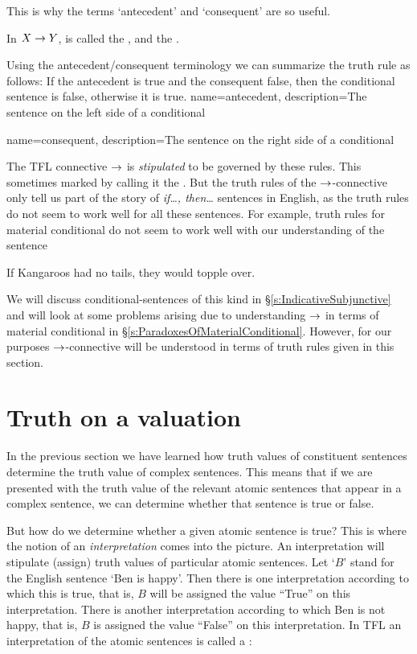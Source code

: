 This is why the terms `antecedent' and `consequent' are so useful.  \begin{highlighted}
In $X\rightarrow Y$, \metaX is called the , and \metaY the .
\end{highlighted}
Using the antecedent/consequent terminology we can summarize the truth rule as follows:
If the antecedent is true and the consequent false, then the conditional sentence is false, otherwise it is true.
{
name=antecedent,
description={The sentence on the left side of a \gls{conditional}}
}


{
name=consequent,
description={The sentence on the right side of a \gls{conditional}}
}

The TFL connective $\rightarrow$ is \emph{stipulated} to be governed by these rules. This sometimes marked by calling it the . But the truth rules of the $\rightarrow$-connective only tell us part of the story of \emph{if\ldots, then\ldots} sentences in English, as the truth rules do not seem to work well for all these sentences. For example, truth rules for material conditional do not seem to work well with our understanding of the sentence
\begin{earg}
\item[\ex{kangaroo}] If Kangaroos had no tails, they would topple over.
\end{earg}
We will discuss conditional-sentences of this kind in \S\ref{s:IndicativeSubjunctive} and will look at some problems arising due to understanding $\rightarrow$ in terms of material conditional in \S\ref{s:ParadoxesOfMaterialConditional}. However, for our purposes $\rightarrow$-connective will be understood in terms of truth rules given in this section.


\section{Truth on a valuation}
In the previous section we have learned how truth values of constituent sentences determine the truth value of complex sentences. This means that if we are presented with the truth value of the relevant atomic sentences that appear in a complex sentence, we can determine whether that sentence is true or false.

But how do we determine whether a given atomic sentence is true? This is where the notion of an \emph{interpretation} comes into the picture. An interpretation will stipulate (assign) truth values of particular atomic sentences. Let `$B$' stand for the English sentence `Ben is happy'. Then there is one interpretation according to which this is true, that is, $B$ will be assigned the value ``True'' on this interpretation. There is another interpretation according to which Ben is not happy, that is, $B$ is assigned the value ``False'' on this interpretation. In TFL an interpretation of the atomic sentences is called a :

